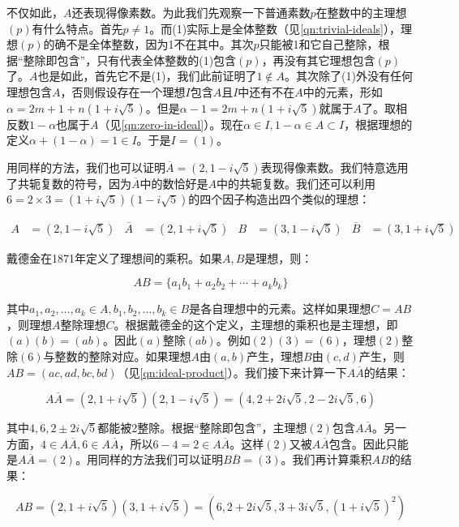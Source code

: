 \documentclass[b5paper]{ctexart}
\begin{document}
不仅如此，$A$还表现得像素数。为此我们先观察一下普通素数$p$在整数中的主理想$(p)$有什么特点。首先$p \ne 1$。而(1)实际上是全体整数（见\cref{qn:trivial-ideals}），理想$(p)$的确不是全体整数，因为1不在其中。其次$p$只能被1和它自己整除，根据“整除即包含”，只有代表全体整数的(1)包含$(p)$，再没有其它理想包含$(p)$了。$A$也是如此，首先它不是(1)，我们此前证明了$1 \notin A$。其次除了(1)外没有任何理想包含$A$，否则假设存在一个理想$I$包含$A$且$I$中还有不在$A$中的元素，形如$\alpha = 2m + 1 + n(1 + i\sqrt{5})$。但是$\alpha - 1 = 2m + n(1 + i\sqrt{5})$就属于$A$了。取相反数$1 - \alpha$也属于$A$（见\cref{qn:zero-in-ideal}）。现在$\alpha \in I, 1 - \alpha \in A \subset I$，根据理想的定义$\alpha + (1 - \alpha) = 1 \in I$。于是$I = (1)$。

用同样的方法，我们也可以证明$\overline{A} = (2, 1 - i\sqrt{5})$表现得像素数。我们特意选用了共轭复数的符号，因为$\overline{A}$中的数恰好是$A$中的共轭复数。我们还可以利用$6 = 2 \times 3 = (1 + i\sqrt{5})(1 - i\sqrt{5})$的四个因子构造出四个类似的理想：

\begin{align*}
A &= (2, 1 - i\sqrt{5})  & \overline{A} &= (2, 1 + i\sqrt{5}) &
B &= (3, 1 - i\sqrt{5})  & \overline{B} &= (3, 1 + i\sqrt{5})
\end{align*}

戴德金在1871年定义了理想间的乘积。如果$A, B$是理想，则：

\[
AB = \{a_1b_1 + a_2b_2 + \dotsb + a_kb_k\}
\]

其中$a_1, a_2, \dotsc, a_k \in A, b_1, b_2, \dotsc, b_k \in B$是各自理想中的元素。这样如果理想$C = AB$，则理想$A$整除理想$C$。根据戴德金的这个定义，主理想的乘积也是主理想，即$(a)(b) = (ab)$。因此$(a)$整除$(ab)$。例如$(2)(3) = (6)$，理想$(2)$整除$(6)$与整数的整除对应。如果理想$A$由$(a, b)$产生，理想$B$由$(c, d)$产生，则$AB = (ac, ad, bc, bd)$（见\cref{qn:ideal-product}）。我们接下来计算一下$A\overline{A}$的结果：

\[
A\overline{A} = (2, 1 + i\sqrt{5})(2, 1 - i\sqrt{5}) = (4, 2 + 2i\sqrt{5}, 2 - 2i\sqrt{5}, 6)
\]

其中$4, 6, 2 \pm 2i\sqrt{5}$都能被2整除。根据“整除即包含”，主理想$(2)$包含$A\overline{A}$。另一方面，$4 \in A\overline{A}, 6 \in A\overline{A}$，所以$6 - 4 = 2 \in A\overline{A}$。这样$(2)$又被$A\overline{A}$包含。因此只能是$A\overline{A} = (2)$。用同样的方法我们可以证明$B\overline{B} = (3)$。我们再计算乘积$AB$的结果：

\[
AB = (2, 1 + i\sqrt{5})(3, 1 + i\sqrt{5}) = (6, 2 + 2i\sqrt{5}, 3 + 3i\sqrt{5}, (1 + i\sqrt{5})^2)
\]
\end{document}
